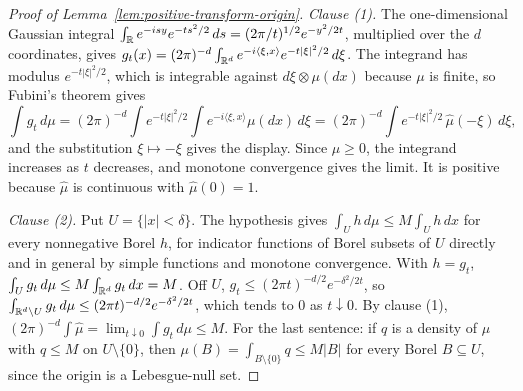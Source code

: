 \begin{proof}[Proof of Lemma~\ref{lem:positive-transform-origin}]
\emph{Clause (1).} The one-dimensional Gaussian integral
$\int_{\mathbb{R}}e^{-isy}e^{-ts^2/2}\,ds = (2\pi/t)^{1/2}e^{-y^2/2t}$, multiplied over the $d$
coordinates, gives $g_t(x) = (2\pi)^{-d}\int_{\mathbb{R}^d}e^{-i\langle\xi,x\rangle}e^{-t|\xi|^2/2}\,d\xi$.
The integrand has modulus $e^{-t|\xi|^2/2}$, which is integrable against $d\xi \otimes \mu(dx)$
because $\mu$ is finite, so Fubini's theorem gives
\[
  \int g_t\,d\mu = (2\pi)^{-d}\int e^{-t|\xi|^2/2}\int e^{-i\langle\xi,x\rangle}\mu(dx)\,d\xi
   = (2\pi)^{-d}\int e^{-t|\xi|^2/2}\,\widehat\mu(-\xi)\,d\xi ,
\]
and the substitution $\xi \mapsto -\xi$ gives the display. Since $\widehat\mu \ge 0$, the integrand
increases as $t$ decreases, and monotone convergence gives the limit. It is positive because
$\widehat\mu$ is continuous with $\widehat\mu(0) = 1$.

\emph{Clause (2).} Put $U = \{|x| < \delta\}$. The hypothesis gives
$\int_U h\,d\mu \le M\int_U h\,dx$ for every nonnegative Borel $h$, for indicator functions of
Borel subsets of $U$ directly and in general by simple functions and monotone convergence. With
$h = g_t$, $\int_U g_t\,d\mu \le M\int_{\mathbb{R}^d}g_t\,dx = M$. Off $U$,
$g_t \le (2\pi t)^{-d/2}e^{-\delta^2/2t}$, so
$\int_{\mathbb{R}^d\setminus U}g_t\,d\mu \le (2\pi t)^{-d/2}e^{-\delta^2/2t}$, which tends to $0$ as
$t \downarrow 0$. By clause (1), $(2\pi)^{-d}\int\widehat\mu = \lim_{t\downarrow0}\int g_t\,d\mu \le
M$. For the last sentence: if $q$ is a density of $\mu$ with $q \le M$ on $U \setminus \{0\}$, then
$\mu(B) = \int_{B\setminus\{0\}}q \le M|B|$ for every Borel $B \subseteq U$, since the origin is a
Lebesgue-null set.
\end{proof}

